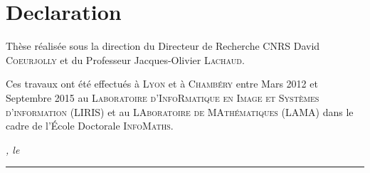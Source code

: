 %
\chapter*{Declaration}
\label{sec:declaration}
\thispagestyle{empty}

\bigskip
\vfill

\noindent Thèse réalisée sous la direction du Directeur de Recherche CNRS David
\textsc{Coeurjolly} et du Professeur Jacques-Olivier \textsc{Lachaud}.

\noindent Ces travaux ont été effectués à \textsc{Lyon} et à \textsc{Chambéry}
entre Mars 2012 et Septembre 2015 au \textsc{Laboratoire d'InfoRmatique en Image
et Systèmes d'information} (\textsc{LIRIS}) et au \textsc{LAboratoire de
MAthématiques} (\textsc{LAMA}) dans le cadre de l'École Doctorale
\textsc{InfoMaths}.

\noindent\textit{\thesisUniversityCity, le \thesisDate}

\smallskip




\begin{flushright}
	\begin{minipage}{5cm}
		\rule{\textwidth}{1pt}
	\end{minipage}\\
	\begin{minipage}{8cm}
		\centering\thesisTitle
	\end{minipage}
\end{flushright}



